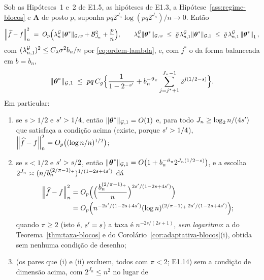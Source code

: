 \documentclass[11pt,a4paper]{article}
\newcommand{\Amat}{\mathbf{A}}
\newcommand{\bn}{b_{n}}
\newcommand{\nGw}[1]{\lVert #1\rVert_{\mathcal{G},w}}
\newcommand{\nGone}[1]{\lVert #1\rVert_{\mathcal{G},1}}
\newcommand{\lamG}{\lambda^{\mathcal{G}}_{n}}
\newcommand{\lamGone}{\lambda^{\mathcal{G}}_{n,1}}
\newcommand{\jst}{j^{*}}
\begin{document}
\setcounter{corollary}{13}
\begin{corollary}\label{cor:lenta-blocos}
Sob as Hipóteses~1 e~2 de E1.5, as hipóteses de E1.3, a
Hipótese~\ref{ass:regime-blocos} e $\Amat$ de posto $p$, suponha
$pq2^{J_{n}}\log(pq2^{J_{n}})/n \to 0$. Então
\begin{equation}
  \label{eq:lenta-blocos}
  \normn{\widehat f - f}^{2}
  \;=\; O_{p}\Bigl(\lamG\nGw{\thetastar} + \mathcal{B}_{J_{n}}^{2}
  + \frac{p}{n}\Bigr),
  \qquad
  \lamG\nGw{\thetastar} \;\le\; \bar\varrho\,\lamGone\nGone{\thetastar}
  \;\le\; \bar\varrho\,\lamGone\norm{\thetastar}_{1},
\end{equation}
com $(\lamGone)^{2} \le C_{\pen}\sigma^{2}\bn/n$ por \eqref{eq:ordem-lambda},
e, com $\jst$ o da forma balanceada em $b = \bn$,
\begin{equation}
  \label{eq:contagem-lenta}
  \nGone{\thetastar} \;\le\; pq\,C_{g}\Bigl\{\frac{1}{1 - 2^{-\seff}}
  + \bn^{-\vartheta_{\pi}}\sum_{\lev=\jst+1}^{J_{n}-1}2^{\lev(1/2-s)}\Bigr\}.
\end{equation}
Em particular:
\begin{enumerate}[label=\textup{(\roman*)}, leftmargin=*]
  \item se $s > 1/2$ e $s' > 1/4$, então $\nGone{\thetastar} = O(1)$ e,
    para todo $J_{n} \ge \log_{2}n/(4s')$ que satisfaça a condição acima
    (existe, porque $s' > 1/4$),
    $\left\lVert \widehat f - f \right\rVert_{n}^{2} = O_{p}\bigl((\log n/n)^{1/2}\bigr)$;
  \item se $s < 1/2$ e $s' > s/2$, então $\nGone{\thetastar} =
    O\bigl(1 + \bn^{-\vartheta_{\pi}}2^{J_{n}(1/2-s)}\bigr)$, e a escolha
    $2^{J_{n}} \asymp (n/\bn^{(2/\pi-1)_{+}})^{1/(1-2s+4\seff)}$ dá
    \[
      \begin{aligned}
      \normn{\widehat f - f}^{2}
      &= O_{p}\Bigl(\Bigl(\frac{\bn^{(2/\pi-1)_{+}}}{n}\Bigr)^{2\seff/(1-2s+4\seff)}\Bigr)\\
      &= O_{p}\Bigl(n^{-2\seff/(1-2s+4\seff)}
        (\log n)^{(2/\pi-1)_{+}\,2\seff/(1-2s+4\seff)}\Bigr);
      \end{aligned}
    \]
    quando $\pi \ge 2$ (isto é, $s' = s$) a taxa é $n^{-2s/(2s+1)}$,
    \emph{sem logaritmo}: a do Teorema~\ref{thm:taxa-blocos} e do
    Corolário~\ref{cor:adaptativa-blocos}(i), obtida sem nenhuma condição de
    desenho;
  \item \textup{(os pares que (i) e (ii) excluem, todos com $\pi < 2$; E1.14)}
    sem a condição de dimensão acima, com $2^{J_{n}} \le n^{2}$ no lugar de

\end{enumerate}
\end{corollary}
\end{document}
